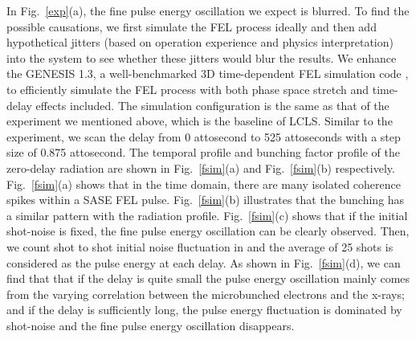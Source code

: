 \documentclass[%
 preprint,
 amsmath,amssymb,
 aps,
 prl,
 superscriptaddress,
 floatfix,
 letter,
]{revtex4-1}
\begin{document}
In Fig.~\ref{exp}(a), the fine pulse energy oscillation we expect is blurred. To find the possible causations, we first simulate the FEL process ideally and then add hypothetical jitters (based on operation experience and physics interpretation) into the system to see whether these jitters would blur the results. We enhance the {\small GENESIS} 1.3, a well-benchmarked 3D time-dependent FEL simulation code \cite{genesis1999}, to efficiently simulate the FEL process with both phase space stretch and time-delay effects included. The simulation configuration is the same as that of the experiment we mentioned above, which is the baseline of LCLS. Similar to the experiment, we scan the delay from 0 attosecond to 525 attoseconds with a step size of 0.875 attosecond. The temporal profile and bunching factor profile of the zero-delay radiation are shown in Fig.~\ref{fsim}(a) and Fig.~\ref{fsim}(b) respectively. Fig.~\ref{fsim}(a) shows that in the time domain, there are many isolated coherence spikes within a SASE FEL pulse. Fig.~\ref{fsim}(b) illustrates that the bunching has a similar pattern with the radiation profile. Fig.~\ref{fsim}(c) shows that if the initial shot-noise is fixed, the fine pulse energy oscillation can be clearly observed. Then, we count shot to shot initial noise fluctuation in and the average of 25 shots is considered as the pulse energy at each delay. As shown in Fig.~\ref{fsim}(d), we can find that that if the delay is quite small the pulse energy oscillation mainly comes from the varying correlation between the microbunched electrons and the x-rays; and if the delay is sufficiently long, the pulse energy fluctuation is dominated by shot-noise and the fine pulse energy oscillation disappears. 
\end{document}
